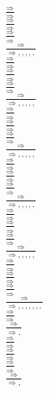 \documentclass[11pt]{article}
\begin{document}
\begin{center}
\bigskip
\\$\frac{\Rightarrow }{\Rightarrow }$
\bigskip
\\$\frac{\Rightarrow }{\Rightarrow }$
\bigskip
\\$\frac{\Rightarrow }{\Rightarrow }$
\bigskip
\\$\frac{\Rightarrow }{\Rightarrow , , , , , }$
\bigskip
\\$\frac{\Rightarrow }{\Rightarrow }$
\bigskip
\\$\frac{\Rightarrow }{\Rightarrow }$
\bigskip
\\$\frac{\Rightarrow }{\Rightarrow }$
\bigskip
\\$\frac{\Rightarrow }{\Rightarrow , , , , , }$
\bigskip
\\$\frac{\Rightarrow }{\Rightarrow }$
\bigskip
\\$\frac{\Rightarrow }{\Rightarrow }$
\bigskip
\\$\frac{\Rightarrow }{\Rightarrow }$
\bigskip
\\$\frac{\Rightarrow }{\Rightarrow , , , , , }$
\bigskip
\\$\frac{\Rightarrow }{\Rightarrow }$
\bigskip
\\$\frac{\Rightarrow }{\Rightarrow }$
\bigskip
\\$\frac{\Rightarrow }{\Rightarrow }$
\bigskip
\\$\frac{\Rightarrow }{\Rightarrow , , , , , }$
\bigskip
\\$\frac{\Rightarrow }{\Rightarrow }$
\bigskip
\\$\frac{\Rightarrow }{\Rightarrow }$
\bigskip
\\$\frac{\Rightarrow }{\Rightarrow }$
\bigskip
\\$\frac{\Rightarrow }{\Rightarrow , , , , , }$
\bigskip
\\$\frac{\Rightarrow }{\Rightarrow }$
\bigskip
\\$\frac{\Rightarrow }{\Rightarrow }$
\bigskip
\\$\frac{\Rightarrow }{\Rightarrow }$
\bigskip
\\$\frac{\Rightarrow }{\Rightarrow , , , , , , , }$
\bigskip
\\$\frac{\Rightarrow }{\Rightarrow }$
\bigskip
\\$\frac{\Rightarrow }{\Rightarrow , }$
\bigskip
\\$\frac{\Rightarrow }{\Rightarrow }$
\bigskip
\\$\frac{\Rightarrow }{\Rightarrow }$
\bigskip
\\$\frac{\Rightarrow }{\Rightarrow }$
\bigskip
\\$\frac{\Rightarrow }{\Rightarrow , }$

\end{center}
\end{document}
